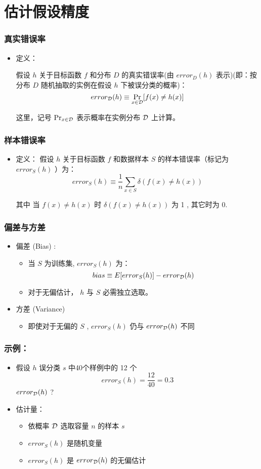 \documentclass{beamer}
\begin{document}
\section{估计假设精度}
\label{sec-2}
\begin{frame}
\frametitle{真实错误率}
\label{sec-2-1}

\begin{itemize}
\item 定义： 

  假设 $h$ 关于目标函数 $f$ 和分布 $D$ 的真实错误率(由 $error_D(h)$ 表示)(即：按分布 $D$ 随机抽取的实例在假设 $h$ 下被误分类的概率)：
    $$error_{\cal{D}}(h) \equiv \Pr_{x \in \cal{D}}[f(x) \neq h(x)]$$

  这里，记号 $\Pr_{x \in \cal{D}}$ 表示概率在实例分布 $\cal{D}$ 上计算。
\end{itemize}
\end{frame}
\begin{frame}
\frametitle{样本错误率}
\label{sec-2-2}

\begin{itemize}
\item 定义： 
  假设 $h$ 关于目标函数 $f$ 和数据样本 $S$ 的样本错误率（标记为 $error_S(h)$ ）为：
  \[error_{S}(h) \equiv \frac{1}{n}\sum_{x \in S}\delta(f(x) \neq h(x))\]

  其中 当 $f(x) \neq h(x)$ 时 $\delta(f(x) \neq h(x))$ 为 1 , 其它时为 0.
\end{itemize}
\end{frame}
\begin{frame}
\frametitle{偏差与方差}
\label{sec-2-3}


\begin{itemize}
\item 偏差 (Bias) :
\begin{itemize}
\item 当 $S$ 为训练集, $error_{S}(h)$ 为：
        \[bias \equiv E[ error_{S}(h)] - error_{\cal{D}}(h)\]
\item 对于无偏估计， $h$ 与 $S$ 必需独立选取。
\end{itemize}
\item 方差 (Variance)
\begin{itemize}
\item 即使对于无偏的 $S$ , $error_{S}(h)$ 仍与 $error_{\cal{D}}(h)$ 不同
\end{itemize}
\end{itemize}
\end{frame}
\begin{frame}
\frametitle{示例：}
\label{sec-2-4}


\begin{itemize}
\item 假设 $h$ 误分类 $s$ 中40个样例中的 12 个
  \[error_{S}(h) = \frac{12}{40} = 0.3\]
   $error_{\cal{D}}(h)$ ?
\item 估计量：
\begin{itemize}
\item 依概率 $\cal{D}$ 选取容量 $n$ 的样本 $s$
\item $error_{S}(h)$ 是随机变量
\item $error_{S}(h)$ 是 $error_{\cal{D}}(h)$ 的无偏估计
\end{itemize}
\end{itemize}
\end{frame}
\end{document}
